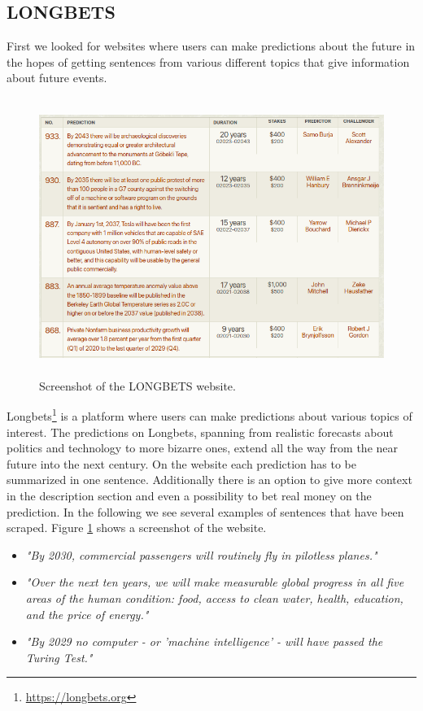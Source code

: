 \documentclass[12pt,oneside,bibtotoc,liststotoc]{scrbook}
\begin{document}
\subsection{LONGBETS}
First we looked for websites where users can make predictions about the future in the hopes of getting sentences from various different topics that give information about future events.
\begin{figure}[h]
  \centering
  \includegraphics[height=9cm]{img/longbets.png}
  \caption{Screenshot of the LONGBETS website.}
  \label{fig:longbets}
\end{figure}
Longbets\footnote{\url{https://longbets.org}} is a platform where users can make predictions about various topics of interest.
The predictions on Longbets, spanning from realistic forecasts about politics and technology to more bizarre ones, extend all the way from the near future into the next century.
On the website each prediction has to be summarized in one sentence. Additionally there is an option to give more context in the description section and even a possibility to bet real money on the prediction.
In the following we see several examples of sentences that have been scraped. Figure \ref{fig:longbets} shows a screenshot of the website.
\begin{itemize}
  \item \textit{"By 2030, commercial passengers will routinely fly in pilotless planes."}
  \item \textit{"Over the next ten years, we will make measurable global progress in all five areas of the human condition: food, access to clean water, health, education, and the price of energy."}
  \item \textit{"By 2029 no computer - or 'machine intelligence' - will have passed the Turing Test."}
\end{itemize}
\end{document}
